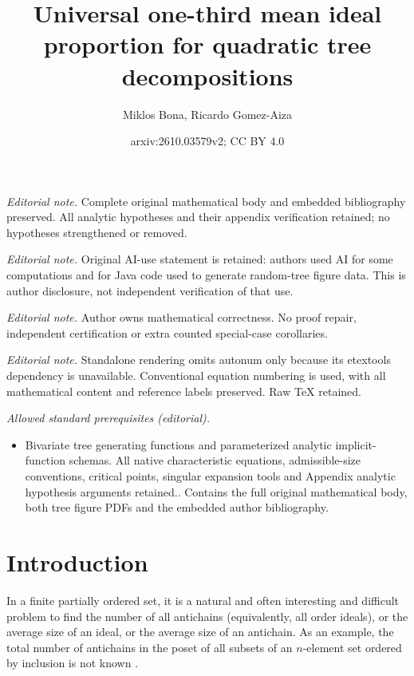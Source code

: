 \documentclass[10pt,a4paper]{amsart}
\title{Universal one-third mean ideal proportion for quadratic tree decompositions}
\author{Miklos Bona, Ricardo Gomez-Aiza}
\date{arxiv:2610.03579v2; CC BY 4.0}
\theoremstyle{remark}
\begin{document}
\maketitle
\noindent\textit{Editorial note.} Complete original mathematical body and embedded bibliography preserved. All analytic hypotheses and their appendix verification retained; no hypotheses strengthened or removed.\par\medskip
\noindent\textit{Editorial note.} Original AI-use statement is retained: authors used AI for some computations and for Java code used to generate random-tree figure data. This is author disclosure, not independent verification of that use.\par\medskip
\noindent\textit{Editorial note.} Author owns mathematical correctness. No proof repair, independent certification or extra counted special-case corollaries.\par\medskip
\noindent\textit{Editorial note.} Standalone rendering omits autonum only because its etextools dependency is unavailable. Conventional equation numbering is used, with all mathematical content and reference labels preserved. Raw TeX retained.\par\medskip
\noindent\textit{Allowed standard prerequisites (editorial).}\begin{itemize}
\item Bivariate tree generating functions and parameterized analytic implicit-function schemas. All native characteristic equations, admissible-size conventions, critical points, singular expansion tools and Appendix analytic hypothesis arguments retained.. Contains the full original mathematical body, both tree figure PDFs and the embedded author bibliography.
\end{itemize}\medskip
\section{Introduction}
In a finite partially ordered set, it is a natural and often interesting and difficult problem to find the number of all antichains (equivalently, all order ideals), or the average size of an ideal, or the average size of an antichain. As an example, the total number of antichains in the poset of all subsets of an $n$-element set
ordered by inclusion is not known \cite{JenssenMalekshahianPark}.
\end{document}
